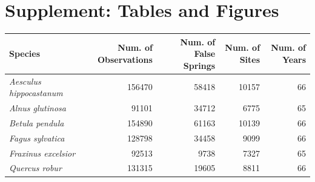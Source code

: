 \documentclass{article}\usepackage[]{graphicx}\usepackage[]{color}
\begin{document}

\newpage
\nocite{NPN2019}


\newpage
\section*{Supplement: Tables and Figures}
  
\begin{center}
 \label{tab:spp} 
\begin{tabular}{l r r r r}
\hline
Species & Num. of Observations & Num. of False Springs & Num. of Sites & Num. of Years \\
\hline
\textit{Aesculus hippocastanum} & 156470 & 58418 & 10157 & 66  \\
\textit{Alnus glutinosa} & 91101 & 34712 & 6775 & 65 \\
\textit{Betula pendula} & 154890 & 61163 & 10139 & 66 \\
\textit{Fagus sylvatica} & 128798 & 34458 & 9099 & 66 \\
\textit{Fraxinus excelsior} & 92513 & 9738 & 7327 & 65 \\
\textit{Quercus robur} & 131315 & 19605 & 8811 & 66 \\
\hline
\end{tabular}
\end{center}

\vspace{15ex}
\end{document}
